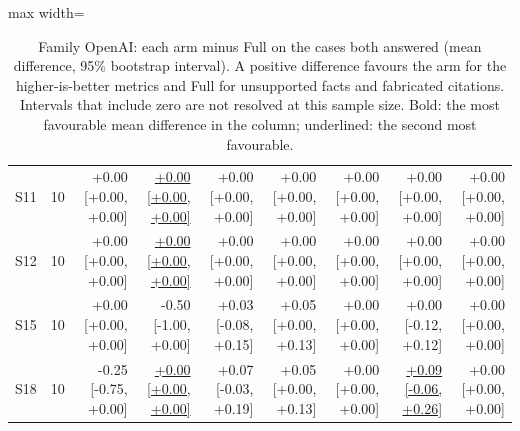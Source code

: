 \begin{table}[t]
\begin{adjustbox}{max width=\textwidth}
\begin{tabular}{@{}lrrrrrrrr@{}}
S11 & 10 & +0.00 [+0.00, +0.00] & \underline{+0.00 [+0.00, +0.00]} & +0.00 [+0.00, +0.00] & +0.00 [+0.00, +0.00] & +0.00 [+0.00, +0.00] & +0.00 [+0.00, +0.00] & +0.00 [+0.00, +0.00] \\
S12 & 10 & +0.00 [+0.00, +0.00] & \underline{+0.00 [+0.00, +0.00]} & +0.00 [+0.00, +0.00] & +0.00 [+0.00, +0.00] & +0.00 [+0.00, +0.00] & +0.00 [+0.00, +0.00] & +0.00 [+0.00, +0.00] \\
S15 & 10 & +0.00 [+0.00, +0.00] & -0.50 [-1.00, +0.00] & +0.03 [-0.08, +0.15] & +0.05 [+0.00, +0.13] & +0.00 [+0.00, +0.00] & +0.00 [-0.12, +0.12] & +0.00 [+0.00, +0.00] \\
S18 & 10 & -0.25 [-0.75, +0.00] & \underline{+0.00 [+0.00, +0.00]} & +0.07 [-0.03, +0.19] & +0.05 [+0.00, +0.13] & +0.00 [+0.00, +0.00] & \underline{+0.09 [-0.06, +0.26]} & +0.00 [+0.00, +0.00] \\
\bottomrule
\end{tabular}
\end{adjustbox}
\caption{Family OpenAI: each arm minus Full on the cases both answered (mean difference, 95\% bootstrap interval). A positive difference favours the arm for the higher-is-better metrics and Full for unsupported facts and fabricated citations. Intervals that include zero are not resolved at this sample size. Bold: the most favourable mean difference in the column; underlined: the second most favourable.}
\label{tab:ablate_openai}
\end{table}